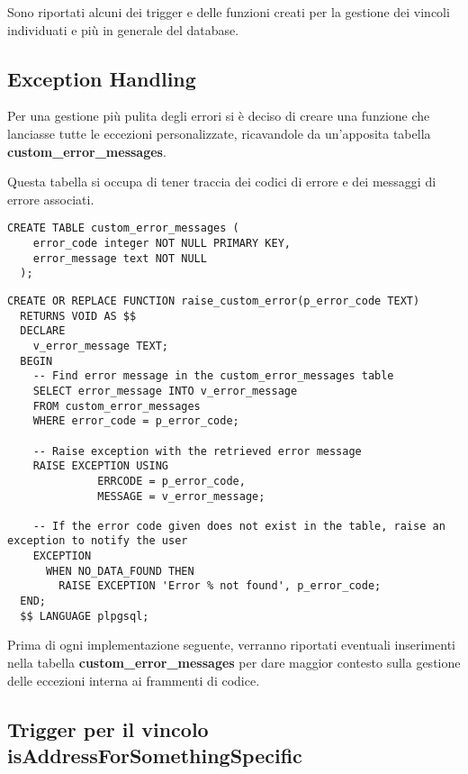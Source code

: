 Sono riportati alcuni dei trigger e delle funzioni creati per la gestione dei vincoli individuati e più in generale del database.

\subsection{Exception Handling}

Per una gestione più pulita degli errori si è deciso di creare una funzione che lanciasse tutte le eccezioni personalizzate, ricavandole da un'apposita tabella \textbf{custom\_error\_messages}.

Questa tabella si occupa di tener traccia dei codici di errore e dei messaggi di errore associati.

\begin{lstlisting}[caption={Creazione della tabella \textbf{custom\_error\_messages}}]
  CREATE TABLE custom_error_messages (
    error_code integer NOT NULL PRIMARY KEY,
    error_message text NOT NULL
  );
\end{lstlisting}

\begin{lstlisting}[caption={Creazione della funzione per gestire le eccezioni}]
  CREATE OR REPLACE FUNCTION raise_custom_error(p_error_code TEXT)
  RETURNS VOID AS $$
  DECLARE
    v_error_message TEXT;
  BEGIN
    -- Find error message in the custom_error_messages table 
    SELECT error_message INTO v_error_message
    FROM custom_error_messages
    WHERE error_code = p_error_code;
  
    -- Raise exception with the retrieved error message
    RAISE EXCEPTION USING 
              ERRCODE = p_error_code, 
              MESSAGE = v_error_message;
    
    -- If the error code given does not exist in the table, raise an exception to notify the user
    EXCEPTION
      WHEN NO_DATA_FOUND THEN
        RAISE EXCEPTION 'Error % not found', p_error_code;
  END;
  $$ LANGUAGE plpgsql;
\end{lstlisting}

Prima di ogni implementazione seguente, verranno riportati eventuali inserimenti nella tabella \textbf{custom\_error\_messages} per dare maggior contesto sulla gestione delle eccezioni interna ai frammenti di codice.

\subsection{Trigger per il vincolo \textbf{isAddressForSomethingSpecific}}


